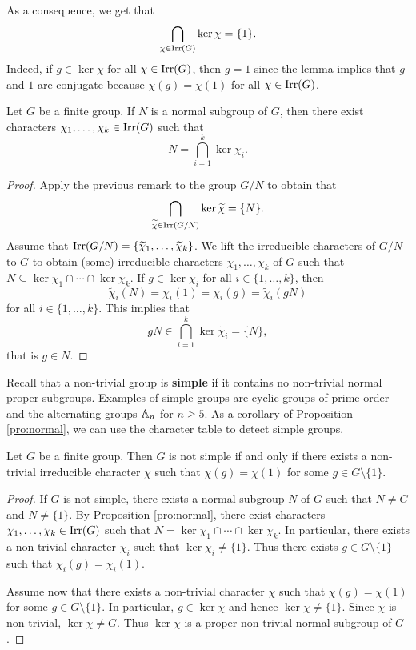 As a consequence, we get that 
\begin{equation}
\label{eq:kernels}
\bigcap_{\chi\in\operatorname{Irr}(G)}\ker\chi=\{1\}.
\end{equation}
Indeed, if $g\in\ker\chi$ for all $\chi\in\operatorname{Irr}(G)$, then $g=1$ since 
the lemma implies that $g$ and $1$ are conjugate
because 
$\chi(g)=\chi(1)$ for all $\chi\in\operatorname{Irr}(G)$.

\begin{proposition}
\label{pro:normal}
    Let $G$ be a finite group. 
    If $N$ is a normal subgroup of $G$, 
    then there exist characters
    $\chi_1,\dots,\chi_k\in\operatorname{Irr}(G)$ 
    such that
    \[
    N=\bigcap_{i=1}^k\ker\chi_i.
    \]
\end{proposition}

\begin{proof}
    Apply the previous remark to the group $G/N$ to obtain that 
    \[
    \bigcap_{\widetilde{\chi}\in\operatorname{Irr}(G/N)}\ker\widetilde{\chi}=\{N\}.
    \]
    Assume that $\operatorname{Irr}(G/N)=\{\widetilde{\chi}_1,\dots,\widetilde{\chi}_k\}$. 
    We lift the irreducible characters of $G/N$ to $G$ 
    to obtain (some) irreducible characters $\chi_1,\dots,\chi_k$ 
    of $G$ such that 
    $N\subseteq\ker\chi_1\cap\cdots\cap\ker\chi_k$. 
    If $g\in\ker\chi_i$ for all $i\in\{1,\dots,k\}$, then 
    \[
    \widetilde{\chi}_i(N)=\chi_i(1)=\chi_i(g)=\widetilde{\chi}_i(gN)
    \]
    for all $i\in\{1,\dots,k\}$. This implies that
    \[
    gN\in\bigcap_{i=1}^k\ker\widetilde{\chi}_i=\{N\},
    \]
    that is $g\in N$. 
\end{proof}

Recall that a non-trivial group is \textbf{simple} if it contains no non-trivial normal 
proper subgroups. Examples of simple groups are cyclic groups of prime order
and the alternating groups $\mathbb{A}_n$ for $n\geq5$. 
As a corollary of Proposition \ref{pro:normal}, 
we can use the character table to detect simple groups.

\begin{proposition}
    Let $G$ be a finite group. Then $G$ is not simple if and only if 
    there exists a non-trivial irreducible character $\chi$ such that
    $\chi(g)=\chi(1)$ 
    for some $g\in G\setminus\{1\}$. 
\end{proposition}

\begin{proof}
    If $G$ is not simple, there exists a normal subgroup $N$ of $G$ such that
    $N\ne G$ and $N\ne\{1\}$. 
    By Proposition \ref{pro:normal}, there exist characters 
    $\chi_1,\dots,\chi_k\in\operatorname{Irr}(G)$
    such that 
    $N=\ker\chi_1\cap\cdots\cap\ker\chi_k$.
    In particular, there exists a non-trivial character
    $\chi_i$ such that $\ker\chi_i\ne\{1\}$. Thus 
    there exists $g\in G\setminus\{1\}$ such that
    $\chi_i(g)=\chi_i(1)$. 
    
    Assume now that there exists a non-trivial character $\chi$ 
    such that $\chi(g)=\chi(1)$ for some $g\in G\setminus\{1\}$. In particular, $g\in\ker\chi$ 
    and hence $\ker\chi\ne\{1\}$. Since $\chi$ is non-trivial, $\ker\chi\ne G$. 
    Thus $\ker\chi$ is a proper non-trivial normal subgroup of $G$.
\end{proof}

